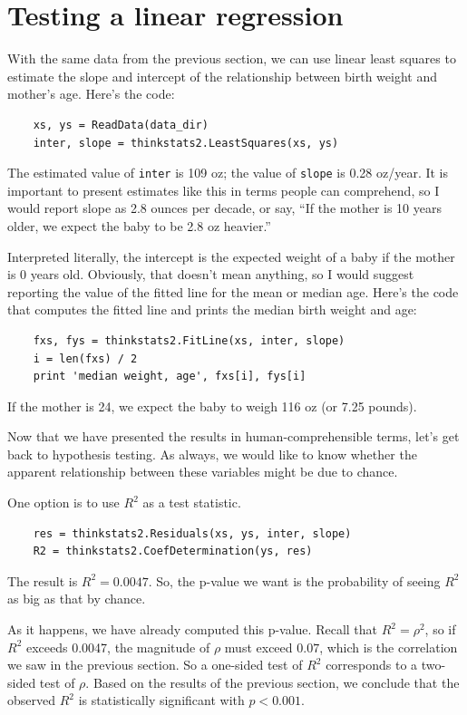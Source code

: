 \documentclass[12pt]{book}
\begin{document}
\section{Testing a linear regression}

With the same data from the previous section, we can use linear
least squares to estimate the slope and intercept of the relationship
between birth weight and mother's age.  Here's the code:

\begin{verbatim}
    xs, ys = ReadData(data_dir)
    inter, slope = thinkstats2.LeastSquares(xs, ys)
\end{verbatim}

The estimated value of {\tt inter} is 109 oz; the value of
{\tt slope} is 0.28 oz/year.  It is important to present estimates
like this in terms people can comprehend, so I would report
slope as 2.8 ounces per decade, or say, ``If the mother is
10 years older, we expect the baby to be 2.8 oz heavier.''

Interpreted literally, the intercept is the expected weight of
a baby if the mother is 0 years old.  Obviously, that doesn't
mean anything, so I would suggest reporting the value of the
fitted line for the mean or median age.  Here's the code that
computes the fitted line and prints the median birth weight
and age:

\begin{verbatim}
    fxs, fys = thinkstats2.FitLine(xs, inter, slope)
    i = len(fxs) / 2
    print 'median weight, age', fxs[i], fys[i]
\end{verbatim}

If the mother is 24, we expect the baby to weigh 116 oz (or 7.25 pounds).

Now that we have presented the results in human-comprehensible terms,
let's get back to hypothesis testing.  As always, we would like to
know whether the apparent relationship between these variables might
be due to chance.

One option is to use $R^2$ as a test statistic.  

\begin{verbatim}
    res = thinkstats2.Residuals(xs, ys, inter, slope)
    R2 = thinkstats2.CoefDetermination(ys, res)
\end{verbatim}

The result is $R^2 = 0.0047$.  So, the p-value we
want is the probability of seeing $R^2$ as big as that by chance.

As it happens, we have already computed this p-value.  Recall that
$R^2 = \rho^2$, so if $R^2$ exceeds 0.0047, the magnitude of $\rho$
must exceed $0.07$, which is the correlation we saw in the previous
section.  So a one-sided test of $R^2$ corresponds to a two-sided
test of $\rho$.  Based on the results of the previous section, we
conclude that the observed $R^2$ is statistically significant with
$p < 0.001$.
\end{document}

